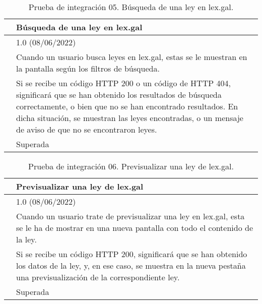 \begin{table}[H]
\begin{center}
\begin{tabular}{|p{3cm}|p{10cm}|} \hline
\centering {\bf PI-05} & Búsqueda de una ley en lex.gal  \\ \hline\hline
\centering {\bf Versión} & 1.0 (08/06/2022) \\ \hline
\centering {\bf Descripción} & Cuando un usuario busca leyes en lex.gal, estas se le muestran en la pantalla según los filtros de búsqueda. \\ \hline
\centering {\bf Criterio de aceptación} & Si se recibe un código HTTP 200 o un código de HTTP 404, significará que se han obtenido los resultados de búsqueda correctamente, o bien que no se han encontrado resultados. En dicha situación, se muestran las leyes encontradas, o un mensaje de aviso de que no se encontraron leyes. \\ \hline
\centering {\bf Estado} & Superada \\ \hline
\end{tabular}
\caption{Prueba de integración 05. Búsqueda de una ley en lex.gal.}
\label{enlacePI5}
\end{center}
\end{table}

\begin{table}[H]
\begin{center}
\begin{tabular}{|p{3cm}|p{10cm}|} \hline
\centering {\bf PI-06} & Previsualizar una ley de lex.gal  \\ \hline\hline
\centering {\bf Versión} & 1.0 (08/06/2022) \\ \hline
\centering {\bf Descripción} & Cuando un usuario trate de previsualizar una ley en lex.gal, esta se le ha de mostrar en una nueva pantalla con todo el contenido de la ley. \\ \hline
\centering {\bf Criterio de aceptación} & Si se recibe un código HTTP 200, significará que se han obtenido los datos de la ley, y, en ese caso, se muestra en la nueva pestaña una previsualización de la correspondiente ley. \\ \hline
\centering {\bf Estado} & Superada \\ \hline
\end{tabular}
\caption{Prueba de integración 06. Previsualizar una ley de lex.gal.}
\label{enlacePI6}
\end{center}
\end{table}

